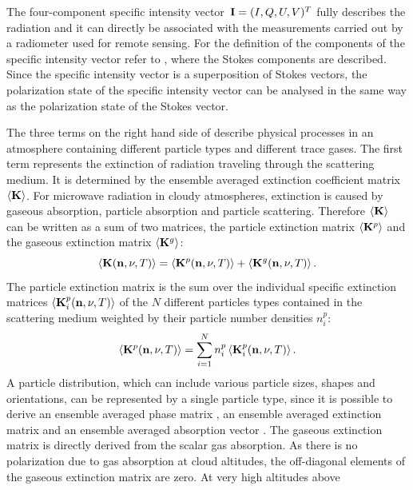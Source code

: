 The four-component specific intensity vector~${\bf I} = (I,Q,U,V)^T$
fully describes the radiation and it can directly be associated with
the measurements carried out by a radiometer used for remote sensing.
For the definition of the components of the specific intensity vector
refer to , where the Stokes
components are described. Since the specific intensity vector is a
superposition of Stokes vectors, the polarization state of the
specific intensity vector can be analysed in the same way as the
polarization state of the Stokes vector.

The three terms on the right hand side of  describe
physical processes in an atmosphere containing different particle
types and different trace gases. The first term represents the
extinction of radiation traveling through the scattering medium. It is
determined by the ensemble averaged extinction coefficient matrix
$\left\langle {\bf K} \right\rangle$.  For microwave radiation in cloudy
atmospheres, extinction is caused by gaseous absorption, particle
absorption and particle scattering. Therefore $\left\langle {\bf K} \right\rangle$
can be written as a sum of two matrices, the particle extinction
matrix $\left\langle {\bf K}^{p} \right\rangle$ and the gaseous extinction matrix
$\left\langle {\bf K}^{g} \right\rangle$:
\begin{equation}
  \left\langle {\bf K}({\bf n}, \nu, T) \right\rangle =
  \left\langle {\bf K}^{p}({\bf n}, \nu, T) \right\rangle+
  \left\langle {\bf K}^{g}({\bf n}, \nu, T) \right\rangle.
\end{equation}
The particle extinction matrix is the sum over the individual specific
extinction matrices $\left\langle {\bf K}_i^p({\bf n}, \nu, T) \right\rangle$ of
the $N$ different particles types contained in the scattering medium
weighted by their particle number densities $n^p_i$:
\begin{equation}
  \left\langle {\bf K}^{p}({\bf n}, \nu, T) \right\rangle =
  \sum_{i=1}^N n^p_i \left\langle {\bf K}_i^p ({\bf n}, \nu, T) \right\rangle.
\label{eq:rtetheory:ext_mat_p}
\end{equation}
A particle distribution, which can include various particle sizes,
shapes and orientations, can be represented by a single particle type,
since it is possible to derive an ensemble averaged phase matrix
, an ensemble averaged extinction matrix
 and an ensemble averaged absorption vector
.  The gaseous extinction matrix is directly derived
from the scalar gas absorption. As there is no polarization due to gas
absorption at cloud altitudes, the off-diagonal elements of the
gaseous extinction matrix are zero. At very high altitudes above
